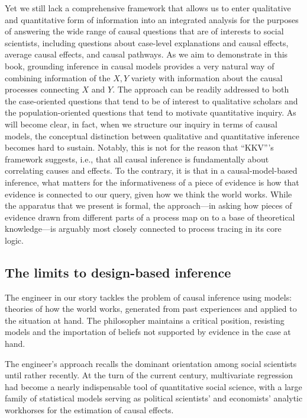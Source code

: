 \documentclass[12pt,]{book}
\begin{document}
Yet we still lack a comprehensive framework that allows us to enter qualitative and quantitative form of information into an integrated analysis for the purposes of answering the wide range of causal questions that are of interests to social scientists, including questions about case-level explanations and causal effects, average causal effects, and causal pathways. As we aim to demonstrate in this book, grounding inference in causal models provides a very natural way of combining information of the \(X,Y\) variety with information about the causal processes connecting \(X\) and \(Y\). The approach can be readily addressed to both the case-oriented questions that tend to be of interest to qualitative scholars and the population-oriented questions that tend to motivate quantitative inquiry. As will become clear, in fact, when we structure our inquiry in terms of causal models, the conceptual distinction between qualitative and quantitative inference becomes hard to sustain. Notably, this is not for the reason that ``KKV'''s framework suggests, i.e., that all causal inference is fundamentally about correlating causes and effects. To the contrary, it is that in a causal-model-based inference, what matters for the informativeness of a piece of evidence is how that evidence is connected to our query, given how we think the world works. While the apparatus that we present is formal, the approach---in asking how pieces of evidence drawn from different parts of a process map on to a base of theoretical knowledge---is arguably most closely connected to process tracing in its core logic.

\hypertarget{the-limits-to-design-based-inference}{%
\subsection{The limits to design-based inference}\label{the-limits-to-design-based-inference}}

The engineer in our story tackles the problem of causal inference using models: theories of how the world works, generated from past experiences and applied to the situation at hand. The philosopher maintains a critical position, resisting models and the importation of beliefs not supported by evidence in the case at hand.

The engineer's approach recalls the dominant orientation among social scientists until rather recently. At the turn of the current century, multivariate regression had become a nearly indispensable tool of quantitative social science, with a large family of statistical models serving as political scientists' and economists' analytic workhorses for the estimation of causal effects.
\end{document}
